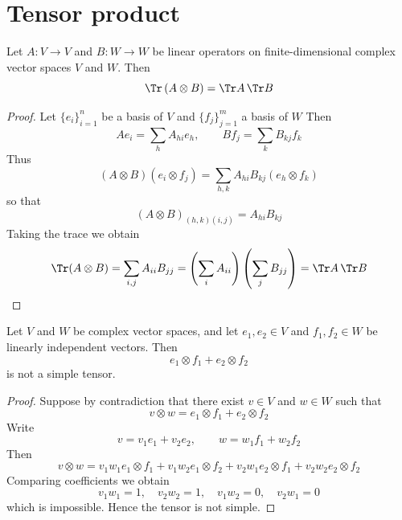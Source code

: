\section{Tensor product}

\begin{lemma}
Let $A: V \to V$ and $B: W \to W$ be linear operators on finite-dimensional complex vector spaces $V$ and $W$. Then
\begin{equation}
    \Tr \left( A \otimes B \right) = \Tr A \, \Tr B
\end{equation}
\end{lemma}

\begin{proof}
    Let $\{ e_i\}_{i=1}^n$ be a basis of $V$ and $\{ f_j\}_{j=1}^m$ a basis of $W$
    Then 
    \begin{equation}
        Ae_i = \sum_h A_{hi}e_h, \qquad Bf_j = \sum_k B_{kj}f_k
    \end{equation}
    Thus
    \begin{equation}
        (A \otimes B) (e_i \otimes f_j) = \sum_{h,k} A_{hi} B_{kj} (e_h \otimes f_k)
    \end{equation}
    so that
    \begin{equation}
        (A \otimes B)_{(h,k)(i,j)} = A_{hi} B_{kj}
    \end{equation}
    Taking the trace we obtain
    \begin{equation}
        \Tr( A \otimes B) = \sum_{i,j} A_{ii} B_{jj} = \left( \sum_i A_{ii} \right)\left( \sum_j B_{jj} \right) = \Tr A \, \Tr B
    \end{equation}
\end{proof}

\begin{lemma}
Let $V$ and $W$ be complex vector spaces, and let $e_1,e_2 \in V$ and $f_1,f_2 \in W$ be linearly independent vectors. Then
\begin{equation}
    e_1 \otimes f_1 + e_2 \otimes f_2
\end{equation}
is not a simple tensor.
\end{lemma}

\begin{proof}
    Suppose by contradiction that there exist $v \in V$ and $w \in W$ such that
    \begin{equation}
        v \otimes w = e_1 \otimes f_1 + e_2 \otimes f_2
    \end{equation}
    Write
    \begin{equation}
        v = v_1 e_1 + v_2 e_2, \qquad w = w_1 f_1 + w_2 f_2
    \end{equation}
    Then
    \begin{equation}
        v \otimes w = v_1 w_1 e_1 \otimes f_1 + v_1 w_2 e_1 \otimes f_2 + v_2 w_1 e_2 \otimes f_1 + v_2 w_2 e_2 \otimes f_2
    \end{equation}
    Comparing coefficients we obtain
    \begin{equation}
        v_1 w_1 = 1, \quad v_2 w_2 = 1, \quad v_1 w_2 = 0, \quad v_2 w_1 = 0
    \end{equation}
    which is impossible. Hence the tensor is not simple.
\end{proof}

